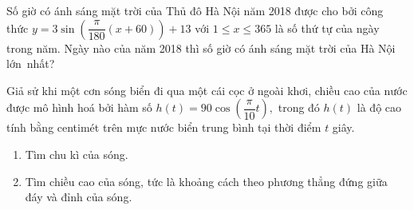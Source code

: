 \begin{ex}%
	Số giờ có ánh sáng mặt trời của Thủ đô Hà Nội năm 2018 được cho bởi công thức $y=3\sin \left(\dfrac{\pi}{180}(x+60) \right)+13$ với $1\leq x \leq 365$ là số thứ tự của ngày trong năm. Ngày nào của năm 2018 thì số giờ có ánh sáng  mặt trời của Hà Nội lớn~nhất?
\end{ex}



\begin{ex}%
	Giả sử khi một cơn sóng biển đi qua một cái cọc ở ngoài khơi, chiều cao của nước được mô hình hoá bởi hàm số $h(t)=90\cos\left(\dfrac{\pi}{10} t\right), $ trong đó $h(t)$ là độ cao tính bằng centimét trên mực nước biển trung bình  tại thời điểm $t$ giây.
	\begin{enumerate}
		\item Tìm chu kì của  sóng.
		\item Tìm chiều cao của sóng, tức là  khoảng cách theo phương thẳng đứng giữa đáy và đỉnh của sóng.
	\end{enumerate}
\end{ex}

